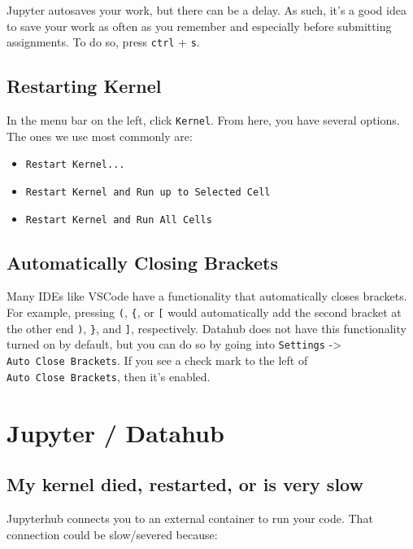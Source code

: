 \documentclass[
  letterpaper,
  DIV=11,
  numbers=noendperiod]{scrreprt}
\providecommand{\tightlist}{%
  \setlength{\itemsep}{0pt}\setlength{\parskip}{0pt}}\usepackage{longtable,booktabs,array}
\begin{document}
Jupyter autosaves your work, but there can be a delay. As such, it's a
good idea to save your work as often as you remember and especially
before submitting assignments. To do so, press \texttt{ctrl} +
\texttt{s}.

\section{Restarting Kernel}\label{restarting-kernel}

In the menu bar on the left, click \texttt{Kernel}. From here, you have
several options. The ones we use most commonly are:

\begin{itemize}
\tightlist
\item
  \texttt{Restart\ Kernel...}
\item
  \texttt{Restart\ Kernel\ and\ Run\ up\ to\ Selected\ Cell}
\item
  \texttt{Restart\ Kernel\ and\ Run\ All\ Cells}
\end{itemize}

\section{Automatically Closing
Brackets}\label{automatically-closing-brackets}

Many IDEs like VSCode have a functionality that automatically closes
brackets. For example, pressing \texttt{(}, \texttt{\{}, or \texttt{{[}}
would automatically add the second bracket at the other end \texttt{)},
\texttt{\}}, and \texttt{{]}}, respectively. Datahub does not have this
functionality turned on by default, but you can do so by going into
\texttt{Settings} -\textgreater{} \texttt{Auto\ Close\ Brackets}. If you
see a check mark to the left of \texttt{Auto\ Close\ Brackets}, then
it's enabled.


\chapter{Jupyter / Datahub}\label{jupyter-datahub}

\section{My kernel died, restarted, or is very
slow}\label{my-kernel-died-restarted-or-is-very-slow}

Jupyterhub connects you to an external container to run your code. That
connection could be slow/severed because:
\end{document}
